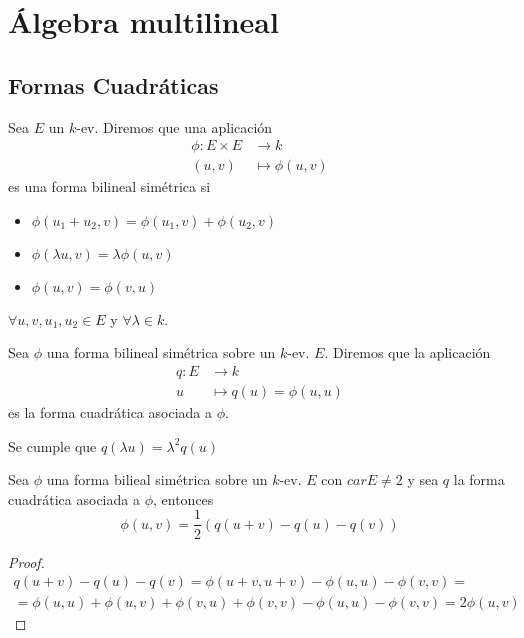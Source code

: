 \section{Álgebra multilineal}

\subsection{Formas Cuadráticas}

\begin{defi}
	Sea $E$ un $k$-ev. Diremos que una aplicación
	\[
	\begin{aligned}
	\phi \colon E \times E &\to k \\
	(u,v) &\mapsto \phi(u,v)
	\end{aligned}
	\]
	es una forma bilineal simétrica si \begin{itemize}
		\item $\phi(u_1 + u_2, v) = \phi(u_1, v) + \phi(u_2, v)$
		\item $\phi(\lambda u, v) = \lambda\phi(u,v)$
		\item $\phi(u,v) = \phi(v,u)$
	\end{itemize}
	$\forall u,v,u_1,u_2 \in E$ y $\forall \lambda \in k$.
\end{defi}
\begin{defi}
	Sea $\phi$ una forma bilineal simétrica sobre un $k$-ev. $E$.
	Diremos que la aplicación
	\[
	\begin{aligned}
	q \colon E &\to k \\
	u &\mapsto q(u) = \phi(u,u)
	\end{aligned}
	\]
	es la forma cuadrática asociada a $\phi$.
\end{defi}
\begin{obs}
	Se cumple que $q(\lambda u) = \lambda^2 q(u)$
\end{obs}
\begin{lema}
	Sea $\phi$ una forma bilieal simétrica sobre un $k$-ev. $E$ con $car E \neq 2$
	y sea $q$ la forma cuadrática asociada a $\phi$, entonces
	\[
	\phi(u,v) = \frac{1}{2} ( q(u+v) - q(u) - q(v))
	\]
\end{lema}
\begin{proof}
	\[
	\begin{split}
	q(u+v) - q(u) - q(v) = \phi(u+v,u+v) - \phi(u,u) - \phi(v,v) = \\
	=\phi(u,u) + \phi(u,v) + \phi(v,u)  + \phi(v,v) - \phi(u,u) - \phi(v,v) =
	2 \phi(u,v)
	\end{split}
	\]
\end{proof}
